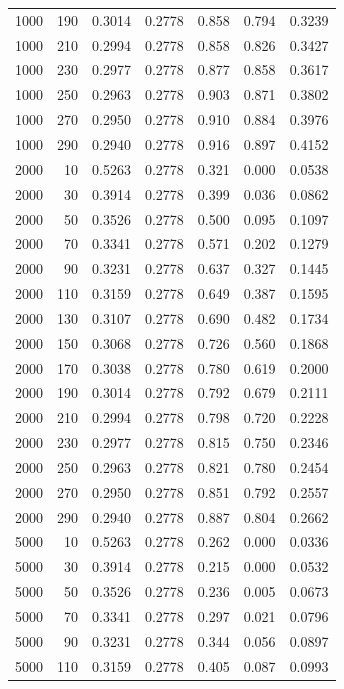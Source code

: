 \begin{tabular}{rrrrrrr}
  1000 & 190 & 0.3014 & 0.2778 & 0.858 & 0.794 & 0.3239 \\ 
  1000 & 210 & 0.2994 & 0.2778 & 0.858 & 0.826 & 0.3427 \\ 
  1000 & 230 & 0.2977 & 0.2778 & 0.877 & 0.858 & 0.3617 \\ 
  1000 & 250 & 0.2963 & 0.2778 & 0.903 & 0.871 & 0.3802 \\ 
  1000 & 270 & 0.2950 & 0.2778 & 0.910 & 0.884 & 0.3976 \\ 
  1000 & 290 & 0.2940 & 0.2778 & 0.916 & 0.897 & 0.4152 \\ 
  2000 & 10 & 0.5263 & 0.2778 & 0.321 & 0.000 & 0.0538 \\ 
  2000 & 30 & 0.3914 & 0.2778 & 0.399 & 0.036 & 0.0862 \\ 
  2000 & 50 & 0.3526 & 0.2778 & 0.500 & 0.095 & 0.1097 \\ 
  2000 & 70 & 0.3341 & 0.2778 & 0.571 & 0.202 & 0.1279 \\ 
  2000 & 90 & 0.3231 & 0.2778 & 0.637 & 0.327 & 0.1445 \\ 
  2000 & 110 & 0.3159 & 0.2778 & 0.649 & 0.387 & 0.1595 \\ 
  2000 & 130 & 0.3107 & 0.2778 & 0.690 & 0.482 & 0.1734 \\ 
  2000 & 150 & 0.3068 & 0.2778 & 0.726 & 0.560 & 0.1868 \\ 
  2000 & 170 & 0.3038 & 0.2778 & 0.780 & 0.619 & 0.2000 \\ 
  2000 & 190 & 0.3014 & 0.2778 & 0.792 & 0.679 & 0.2111 \\ 
  2000 & 210 & 0.2994 & 0.2778 & 0.798 & 0.720 & 0.2228 \\ 
  2000 & 230 & 0.2977 & 0.2778 & 0.815 & 0.750 & 0.2346 \\ 
  2000 & 250 & 0.2963 & 0.2778 & 0.821 & 0.780 & 0.2454 \\ 
  2000 & 270 & 0.2950 & 0.2778 & 0.851 & 0.792 & 0.2557 \\ 
  2000 & 290 & 0.2940 & 0.2778 & 0.887 & 0.804 & 0.2662 \\ 
  5000 & 10 & 0.5263 & 0.2778 & 0.262 & 0.000 & 0.0336 \\ 
  5000 & 30 & 0.3914 & 0.2778 & 0.215 & 0.000 & 0.0532 \\ 
  5000 & 50 & 0.3526 & 0.2778 & 0.236 & 0.005 & 0.0673 \\ 
  5000 & 70 & 0.3341 & 0.2778 & 0.297 & 0.021 & 0.0796 \\ 
  5000 & 90 & 0.3231 & 0.2778 & 0.344 & 0.056 & 0.0897 \\ 
  5000 & 110 & 0.3159 & 0.2778 & 0.405 & 0.087 & 0.0993 \\ 

\end{tabular}
